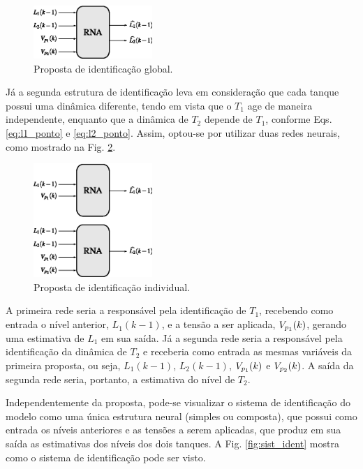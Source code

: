 \begin{figure}[htb]
\centering
    \includegraphics[width=0.4\textwidth]{imgs/sistema/eps/ident_proposta_1}
    \caption{Proposta de identificação global.}
    \label{fig:ident_proposta_1}
\end{figure}

Já a segunda estrutura de identificação leva em consideração que cada tanque
possui uma dinâmica diferente, tendo em vista que o $T_1$ age de maneira
independente, enquanto que a dinâmica de $T_2$ depende de $T_1$, conforme Eqs.
\ref{eq:l1_ponto} e \ref{eq:l2_ponto}. Assim, optou-se por utilizar duas redes
neurais, como mostrado na Fig. \ref{fig:ident_proposta_2}.

\begin{figure}[htb]
\centering
    \includegraphics[width=0.4\textwidth]{imgs/sistema/eps/ident_proposta_2}
    \caption{Proposta de identificação individual.}
    \label{fig:ident_proposta_2}
\end{figure}

A primeira rede seria a responsável pela identificação de $T_1$, recebendo como
entrada o nível anterior, $L_1(k-1)$, e a tensão a ser aplicada, $V_{p_{\tiny
1}}(k)$, gerando uma estimativa de $L_1$ em sua saída. Já a segunda rede seria a
responsável pela identificação da dinâmica de $T_2$ e receberia como entrada as
mesmas variáveis da primeira proposta, ou seja, $L_1(k-1)$, $L_2(k-1)$,
$V_{p_{\tiny 1}}(k)$ e $V_{p_{\tiny 2}}(k)$. A saída da segunda rede seria,
portanto, a estimativa do nível de $T_2$.

Independentemente da proposta, pode-se visualizar o sistema de identificação do
modelo como uma única estrutura neural (simples ou composta), que possui como
entrada os níveis anteriores e as tensões a serem aplicadas, que produz em sua
saída as estimativas dos níveis dos dois tanques. A Fig. \ref{fig:sist_ident}
mostra como o sistema de identificação pode ser visto.


